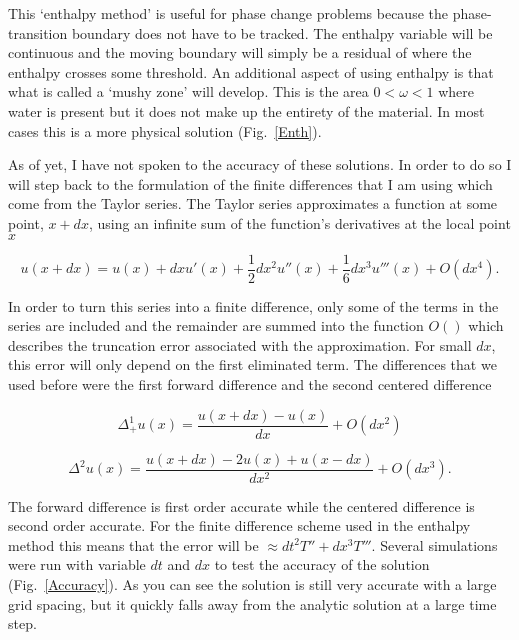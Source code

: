 \documentclass[12pt]{article}
\begin{document}
This `enthalpy method' is useful for phase change problems \citep{Voller1981} because the phase-transition boundary does not have to be tracked. The enthalpy variable will be continuous and the moving boundary will simply be a residual of where the enthalpy crosses some threshold. An additional aspect of using enthalpy is that what is called a `mushy zone' will develop. This is the area $0<\omega<1$ where water is present but it does not make up the entirety of the material. In most cases this is a more physical solution (Fig.~\ref{Enth}).

As of yet, I have not spoken to the accuracy of these solutions. In order to do so I will step back to the formulation of the finite differences that I am using which come from the Taylor series. The Taylor series approximates a function at some point, $x+dx$, using an infinite sum of the function's derivatives at the local point $x$

\begin{equation}
u(x+dx) = u(x) + dx u'(x) + \frac{1}{2}dx^2 u''(x) + \frac{1}{6}dx^3 u'''(x) + O(dx^4).
\end{equation}

In order to turn this series into a finite difference, only some of the terms in the series are included and the remainder are summed into the function $O()$ which describes the truncation error associated with the approximation. For small $dx$, this error will only depend on the first eliminated term. The differences that we used before were the first forward difference and the second centered difference 

\begin{equation}
\Delta_+^1 u(x) = \frac{u(x+dx) - u(x)}{dx} + O(dx^2)
\end{equation}

\begin{equation}
\Delta^2 u(x) = \frac{u(x+dx) - 2u(x) + u(x-dx)}{dx^2} + O(dx^3).
\end{equation}

The forward difference is first order accurate while the centered difference is second order accurate. For the finite difference scheme used in the enthalpy method this means that the error will be $\approx dt^2T'' + dx^3T'''$. Several simulations were run with variable $dt$ and $dx$ to test the accuracy of the solution (Fig.~\ref{Accuracy}). As you can see the solution is still very accurate with a large grid spacing, but it quickly falls away from the analytic solution at a large time step. 
\end{document}
